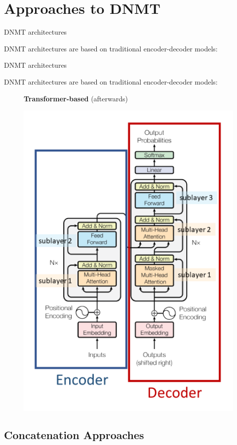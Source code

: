 \section{Approaches to DNMT}

\begin{frame}{DNMT architectures}

	DNMT architectures are based on traditional encoder-decoder models:
	
\end{frame}

\begin{frame}{DNMT architectures}
	
	DNMT architectures are based on traditional encoder-decoder models:
	
	\begin{figure}
		\centering
		\textbf{Transformer-based} (afterwards)\par\medskip
		\includegraphics[width=0.3\linewidth]{Images/transformer}
		\label{fig:concatenation}
	\end{figure}
\end{frame}

\subsection{Concatenation Approaches}

